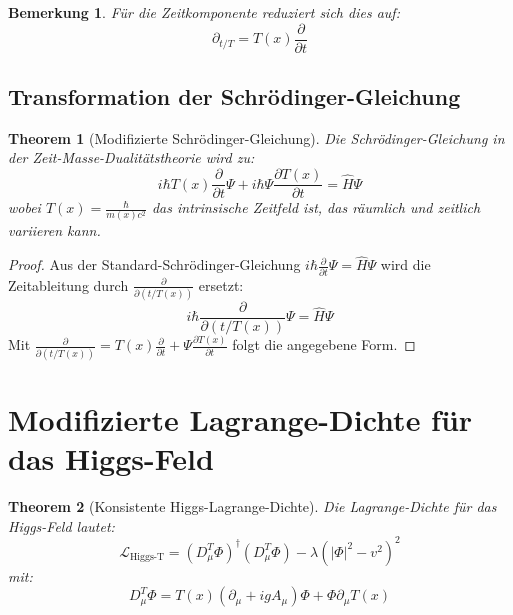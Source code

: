 \documentclass[a4paper,12pt]{article}
\newtheorem{theorem}{Theorem}[section]
\newtheorem{remark}{Bemerkung}[section]
\begin{document}
	\begin{remark}
		Für die Zeitkomponente reduziert sich dies auf:
		\begin{equation}
			\partial_{t/T} = T(x) \frac{\partial}{\partial t}
		\end{equation}
	\end{remark}
	
	\subsection{Transformation der Schrödinger-Gleichung}
	
	\begin{theorem}[Modifizierte Schrödinger-Gleichung]
		Die Schrödinger-Gleichung in der Zeit-Masse-Dualitätstheorie wird zu:
		\begin{equation}
			i\hbar T(x) \frac{\partial}{\partial t} \Psi + i\hbar \Psi \frac{\partial T(x)}{\partial t} = \hat{H} \Psi
		\end{equation}
		wobei \( T(x) = \frac{\hbar}{m(x) c^2} \) das intrinsische Zeitfeld ist, das räumlich und zeitlich variieren kann.
	\end{theorem}
	
	\begin{proof}
		Aus der Standard-Schrödinger-Gleichung \( i\hbar \frac{\partial}{\partial t} \Psi = \hat{H} \Psi \) wird die Zeitableitung durch \( \frac{\partial}{\partial (t/T(x))} \) ersetzt:
		\begin{equation}
			i\hbar \frac{\partial}{\partial (t/T(x))} \Psi = \hat{H} \Psi
		\end{equation}
		Mit \( \frac{\partial}{\partial (t/T(x))} = T(x) \frac{\partial}{\partial t} + \Psi \frac{\partial T(x)}{\partial t} \) folgt die angegebene Form.
	\end{proof}
	
	\section{Modifizierte Lagrange-Dichte für das Higgs-Feld}
	

	
	\begin{theorem}[Konsistente Higgs-Lagrange-Dichte]
		Die Lagrange-Dichte für das Higgs-Feld lautet:
		\begin{equation}
			\mathcal{L}_{\text{Higgs-T}} = (D_\mu^T \Phi)^\dagger (D_\mu^T \Phi) - \lambda (|\Phi|^2 - v^2)^2
		\end{equation}
		mit:
		\begin{equation}
			D_\mu^T \Phi = T(x) (\partial_\mu + i g A_\mu) \Phi + \Phi \partial_\mu T(x)
		\end{equation}
	\end{theorem}
\end{document}
